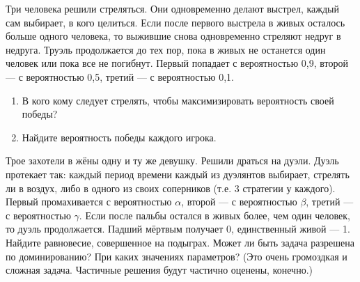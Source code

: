 \begin{problem}[Труэль][T]
Три человека решили стреляться. Они одновременно делают выстрел, каждый сам выбирает, в кого целиться. Если после первого выстрела в живых осталось больше одного человека, то выжившие снова одновременно стреляют недруг в недруга. Труэль продолжается до тех пор, пока в живых не останется один человек или пока все не погибнут. Первый попадает с вероятностью 0,9, второй  — с вероятностью 0,5, третий — с вероятностью 0,1.\par
\begin{enumerate}
\item  В кого кому следует стрелять, чтобы максимизировать вероятность своей победы?\par
\item Найдите вероятность победы каждого игрока.\par

\end{enumerate}


\begin{sol}

\end{sol}
\end{problem}


\begin{problem}[Дуэль.]
\begin{source}
\cite{savva:nmu}
\end{source}
Трое захотели в жёны одну и ту же девушку. Решили драться на дуэли. Дуэль протекает так: каждый период времени каждый из дуэлянтов выбирает, стрелять ли в воздух, либо в одного из своих соперников (т.е. 3 стратегии у каждого). Первый промахивается с вероятностью $\alpha$, второй — с вероятностью $\beta$, третий — с вероятностью $\gamma$. Если после пальбы остался в живых более, чем один человек, то дуэль продолжается. Падший мёртвым получает 0, единственный живой — 1. Найдите равновесие, совершенное на подыграх. Может ли быть задача разрешена по доминированию? При каких значениях параметров? (Это очень громоздкая и сложная задача. Частичные решения будут частично оценены, конечно.)

\begin{sol}

\end{sol}
\end{problem}

